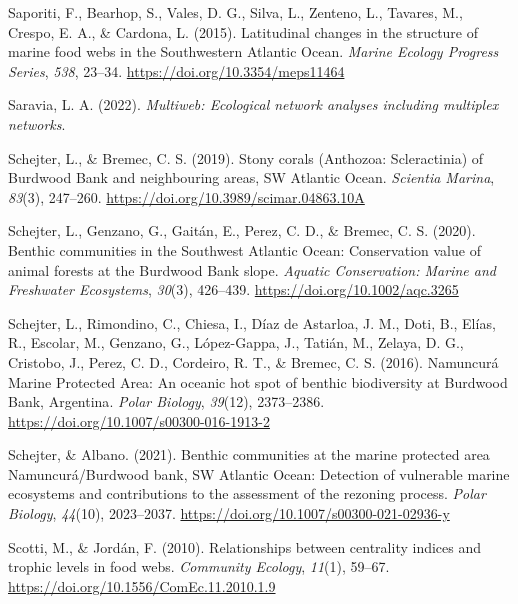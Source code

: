 \documentclass[preprint, 3p,
authoryear]{elsarticle} %
\newlength{\cslhangindent}
\newlength{\cslentryspacingunit} %
\newenvironment{CSLReferences}[2] %
 {%
  \setlength{\parindent}{0pt}
  \ifodd #1
  \let\oldpar\par
  \def\par{\hangindent=\cslhangindent\oldpar}
  \fi
  \setlength{\parskip}{#2\cslentryspacingunit}
 }%
 {}
\begin{document}
\begin{CSLReferences}{1}{0}
\leavevmode{}%
Saporiti, F., Bearhop, S., Vales, D. G., Silva, L., Zenteno, L.,
Tavares, M., Crespo, E. A., \& Cardona, L. (2015). Latitudinal changes
in the structure of marine food webs in the {Southwestern Atlantic
Ocean}. \emph{Marine Ecology Progress Series}, \emph{538}, 23--34.
\url{https://doi.org/10.3354/meps11464}

\leavevmode{}%
Saravia, L. A. (2022). \emph{Multiweb: {Ecological} network analyses
including multiplex networks}.

\leavevmode{}%
Schejter, L., \& Bremec, C. S. (2019). Stony corals ({Anthozoa}:
{Scleractinia}) of {Burdwood Bank} and neighbouring areas, {SW Atlantic
Ocean}. \emph{Scientia Marina}, \emph{83}(3), 247--260.
\url{https://doi.org/10.3989/scimar.04863.10A}

\leavevmode{}%
Schejter, L., Genzano, G., Gaitán, E., Perez, C. D., \& Bremec, C. S.
(2020). Benthic communities in the {Southwest Atlantic Ocean}:
{Conservation} value of animal forests at the {Burdwood Bank} slope.
\emph{Aquatic Conservation: Marine and Freshwater Ecosystems},
\emph{30}(3), 426--439. \url{https://doi.org/10.1002/aqc.3265}

\leavevmode{}%
Schejter, L., Rimondino, C., Chiesa, I., Díaz de Astarloa, J. M., Doti,
B., Elías, R., Escolar, M., Genzano, G., López-Gappa, J., Tatián, M.,
Zelaya, D. G., Cristobo, J., Perez, C. D., Cordeiro, R. T., \& Bremec,
C. S. (2016). Namuncurá {Marine Protected Area}: An oceanic hot spot of
benthic biodiversity at {Burdwood Bank}, {Argentina}. \emph{Polar
Biology}, \emph{39}(12), 2373--2386.
\url{https://doi.org/10.1007/s00300-016-1913-2}

\leavevmode{}%
Schejter, \& Albano. (2021). Benthic communities at the marine protected
area {Namuncurá}/{Burdwood} bank, {SW Atlantic Ocean}: Detection of
vulnerable marine ecosystems and contributions to the assessment of the
rezoning process. \emph{Polar Biology}, \emph{44}(10), 2023--2037.
\url{https://doi.org/10.1007/s00300-021-02936-y}

\leavevmode{}%
Scotti, M., \& Jordán, F. (2010). Relationships between centrality
indices and trophic levels in food webs. \emph{Community Ecology},
\emph{11}(1), 59--67. \url{https://doi.org/10.1556/ComEc.11.2010.1.9}


\end{CSLReferences}
\end{document}
